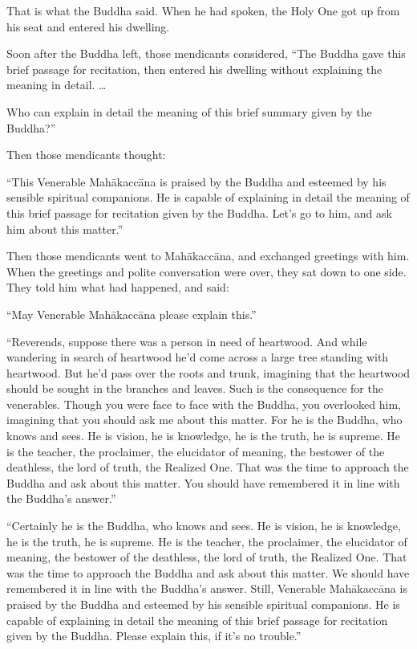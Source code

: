 \documentclass[12pt,openany]{book}%
\begin{document}
That is what the Buddha said. When he had spoken, the Holy One got up from his seat and entered his dwelling. 

Soon after the Buddha left, those mendicants considered, “The Buddha gave this brief passage for recitation, then entered his dwelling without explaining the meaning in detail. … 

Who can explain in detail the meaning of this brief summary given by the Buddha?” 

Then those mendicants thought: 

“This Venerable \textsanskrit{Mahākaccāna} is praised by the Buddha and esteemed by his sensible spiritual companions. He is capable of explaining in detail the meaning of this brief passage for recitation given by the Buddha. Let’s go to him, and ask him about this matter.” 

Then those mendicants went to \textsanskrit{Mahākaccāna}, and exchanged greetings with him. When the greetings and polite conversation were over, they sat down to one side. They told him what had happened, and said: 

“May Venerable \textsanskrit{Mahākaccāna} please explain this.” 

“Reverends, suppose there was a person in need of heartwood. And while wandering in search of heartwood he’d come across a large tree standing with heartwood. But he’d pass over the roots and trunk, imagining that the heartwood should be sought in the branches and leaves. Such is the consequence for the venerables. Though you were face to face with the Buddha, you overlooked him, imagining that you should ask me about this matter. For he is the Buddha, who knows and sees. He is vision, he is knowledge, he is the truth, he is supreme. He is the teacher, the proclaimer, the elucidator of meaning, the bestower of the deathless, the lord of truth, the Realized One. That was the time to approach the Buddha and ask about this matter. You should have remembered it in line with the Buddha’s answer.” 

“Certainly he is the Buddha, who knows and sees. He is vision, he is knowledge, he is the truth, he is supreme. He is the teacher, the proclaimer, the elucidator of meaning, the bestower of the deathless, the lord of truth, the Realized One. That was the time to approach the Buddha and ask about this matter. We should have remembered it in line with the Buddha’s answer. Still, Venerable \textsanskrit{Mahākaccāna} is praised by the Buddha and esteemed by his sensible spiritual companions. He is capable of explaining in detail the meaning of this brief passage for recitation given by the Buddha. Please explain this, if it’s no trouble.” 
\end{document}
